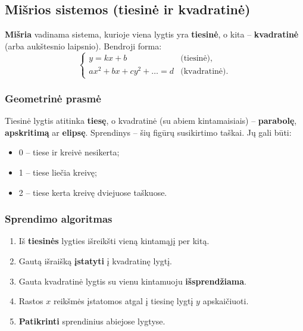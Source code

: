 \subsection{Mišrios sistemos (tiesinė ir kvadratinė)}

\begin{definition}
\textbf{Mišria} vadinama sistema, kurioje viena lygtis yra \textbf{tiesinė}, o kita -- \textbf{kvadratinė} (arba aukštesnio laipsnio). Bendroji forma:
\[
  \begin{cases}
    y = kx + b & \text{(tiesinė)},\\
    ax^2 + bx + cy^2 + \ldots = d & \text{(kvadratinė)}.
  \end{cases}
\]
\end{definition}

\subsubsection*{Geometrinė prasmė}

Tiesinė lygtis atitinka \textbf{tiesę}, o kvadratinė (su abiem kintamaisiais) -- \textbf{parabolę}, \textbf{apskritimą} ar \textbf{elipsę}. Sprendinys -- šių figūrų susikirtimo taškai. Jų gali būti:
\begin{itemize}
  \item 0 -- tiese ir kreivė nesikerta;
  \item 1 -- tiese liečia kreivę;
  \item 2 -- tiese kerta kreivę dviejuose taškuose.
\end{itemize}

\subsubsection*{Sprendimo algoritmas}

\begin{enumerate}[label=\arabic*.]
  \item Iš \textbf{tiesinės} lygties išreikšti vieną kintamąjį per kitą.
  \item Gautą išraišką \textbf{įstatyti} į kvadratinę lygtį.
  \item Gauta kvadratinė lygtis su vienu kintamuoju \textbf{išsprendžiama}.
  \item Rastos $x$ reikšmės įstatomos atgal į tiesinę lygtį $y$ apskaičiuoti.
  \item \textbf{Patikrinti} sprendinius abiejose lygtyse.
\end{enumerate}

